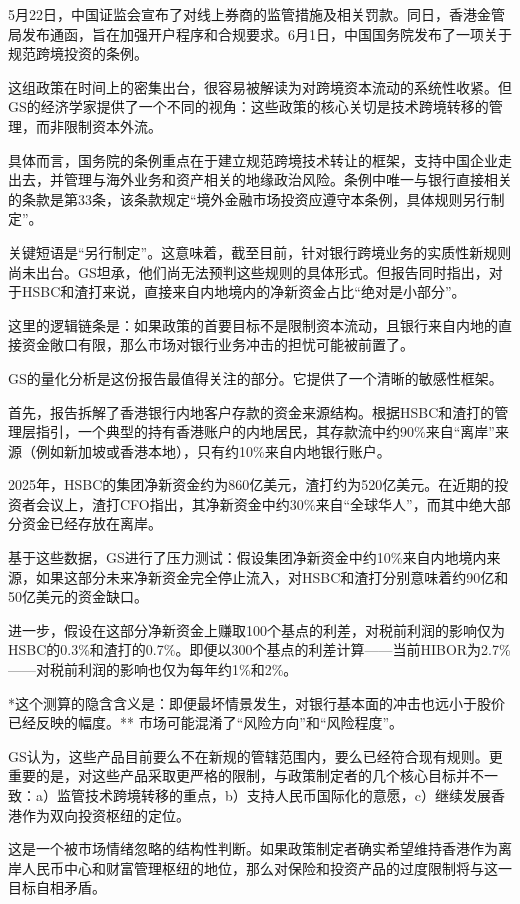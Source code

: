 \documentclass[11pt]{ctexart}
\begin{document}
5月22日，中国证监会宣布了对线上券商的监管措施及相关罚款。同日，香港金管局发布通函，旨在加强开户程序和合规要求。6月1日，中国国务院发布了一项关于规范跨境投资的条例。

这组政策在时间上的密集出台，很容易被解读为对跨境资本流动的系统性收紧。但GS的经济学家提供了一个不同的视角：这些政策的核心关切是技术跨境转移的管理，而非限制资本外流。

具体而言，国务院的条例重点在于建立规范跨境技术转让的框架，支持中国企业走出去，并管理与海外业务和资产相关的地缘政治风险。条例中唯一与银行直接相关的条款是第33条，该条款规定“境外金融市场投资应遵守本条例，具体规则另行制定”。

关键短语是“另行制定”。这意味着，截至目前，针对银行跨境业务的实质性新规则尚未出台。GS坦承，他们尚无法预判这些规则的具体形式。但报告同时指出，对于HSBC和渣打来说，直接来自内地境内的净新资金占比“绝对是小部分”。

这里的逻辑链条是：如果政策的首要目标不是限制资本流动，且银行来自内地的直接资金敞口有限，那么市场对银行业务冲击的担忧可能被前置了。

GS的量化分析是这份报告最值得关注的部分。它提供了一个清晰的敏感性框架。

首先，报告拆解了香港银行内地客户存款的资金来源结构。根据HSBC和渣打的管理层指引，一个典型的持有香港账户的内地居民，其存款流中约90\%来自“离岸”来源（例如新加坡或香港本地），只有约10\%来自内地银行账户。

2025年，HSBC的集团净新资金约为860亿美元，渣打约为520亿美元。在近期的投资者会议上，渣打CFO指出，其净新资金中约30\%来自“全球华人”，而其中绝大部分资金已经存放在离岸。

基于这些数据，GS进行了压力测试：假设集团净新资金中约10\%来自内地境内来源，如果这部分未来净新资金完全停止流入，对HSBC和渣打分别意味着约90亿和50亿美元的资金缺口。

进一步，假设在这部分净新资金上赚取100个基点的利差，对税前利润的影响仅为HSBC的0.3\%和渣打的0.7\%。即便以300个基点的利差计算——当前HIBOR为2.7\%——对税前利润的影响也仅为每年约1\%和2\%。

*这个测算的隐含含义是：即便最坏情景发生，对银行基本面的冲击也远小于股价已经反映的幅度。** 市场可能混淆了“风险方向”和“风险程度”。

GS认为，这些产品目前要么不在新规的管辖范围内，要么已经符合现有规则。更重要的是，对这些产品采取更严格的限制，与政策制定者的几个核心目标并不一致：a）监管技术跨境转移的重点，b）支持人民币国际化的意愿，c）继续发展香港作为双向投资枢纽的定位。

这是一个被市场情绪忽略的结构性判断。如果政策制定者确实希望维持香港作为离岸人民币中心和财富管理枢纽的地位，那么对保险和投资产品的过度限制将与这一目标自相矛盾。
\end{document}
